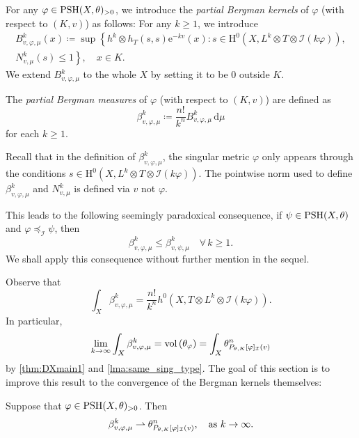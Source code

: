 \begin{definition}\label{def:Bergman:L778}
    For any $\varphi\in \mathrm{PSH}(X,\theta)_{>0}$, we introduce the \emph{partial Bergman kernels} of $\varphi$ (with respect to $(K,v)$) as follows: For any $k\geq 1$, we introduce
    \begin{equation}
    \begin{aligned}
     B^k_{v,\varphi, \mu}(x) \coloneqq \sup \left\{h^k \otimes h_T(s,s)\mathrm{e}^{-kv}(x):s \in \mathrm{H}^0\left(X,L^k \otimes T \otimes \mathcal{I}(k\varphi)\right),\right.\\
     \left. N^k_{v,\mu}(s) \leq 1 \right\},\quad x\in K.
     \end{aligned}
 \end{equation}
 We extend $B^k_{v,\varphi, \mu}$ to the whole $X$ by setting it to be $0$ outside $K$.

 The \emph{partial Bergman measures} of $\varphi$ (with respect to $(K,v)$) are defined as
 \begin{equation}
\beta^k_{v,\varphi,\mu} \coloneqq \frac{n!}{k^n} B^k_{v,\varphi,\mu} \,\mathrm{d}\mu
\end{equation}
for each $k\geq 1$.
\end{definition}

\begin{remark}\label{rmk:Bergman:L797}
    Recall that in the definition of $\beta^k_{v,\varphi,\mu}$, the singular metric $\varphi$ only appears through the conditions $s \in \mathrm{H}^0(X,L^k \otimes T \otimes \mathcal{I}(k\varphi))$. The pointwise norm used to define $\beta^k_{v,\varphi,\mu}$ and $N^k_{v,\mu}$ is defined via $v$ not $\varphi$.

    This leads to the following seemingly paradoxical consequence, if $\psi\in \mathrm{PSH}(X,\theta)$ and $\varphi\preceq_{\mathcal{I}}\psi$, then
    \[
        \beta^k_{v,\varphi,\mu}\leq \beta^k_{v,\psi,\mu}\quad \forall\,k\geq 1.
    \]
    We shall apply this consequence without further mention in the sequel.
\end{remark}


Observe that
\[
    \int_X \beta^k_{v,\varphi,\mu}=\frac{n!}{k^n}h^0\left(X,T\otimes L^k \otimes \mathcal{I}(k\varphi)\right).
\]
In particular,
\begin{equation}\label{eq:betaint_conv}
    \lim_{k\to\infty}\int_X \beta^k_{v,\varphi,\mu}=\operatorname{vol}\left(\theta_{\varphi}\right)=\int_X \theta_{P_{\theta,K}[\varphi]_{\mathcal{I}}(v)}^n
\end{equation}
by \cref{thm:DXmain1} and \cref{lma:same_sing_type}. The goal of this section is to improve this result to the convergence of the Bergman kernels themselves:
\begin{theorem}\label{thm:pBMconvergence} Suppose that $\varphi \in \mathrm{PSH}(X,\theta)_{>0}$. Then
\begin{equation}\label{eq:pbkconvgeneral}
\beta^k_{v,\varphi,\mu} \rightharpoonup \theta_{P_{\theta,K}[\varphi]_{\mathcal{I}}(v)}^n,\quad \textup{as }k\to\infty.
\end{equation}
\end{theorem}


